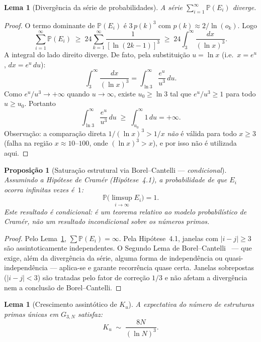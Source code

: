 \documentclass[12pt,a4paper]{article}
\newtheorem{proposition}[theorem]{Proposi\c{c}\~ao}
\newtheorem{lemma}[theorem]{Lema}
\theoremstyle{remark}
\newcommand{\bP}{\mathbb{P}}
\begin{document}
	\begin{lemma}[Divergência da série de probabilidades]
		\label{lem:diverge}
		A s\'erie $\sum_{i=1}^{\infty}\bP(E_i)$ diverge.
	\end{lemma}
	\begin{proof}
		O termo dominante de $\bP(E_i)$ \'e $3\,p(k)^3$ com $p(k)\approx 2/\ln(o_k)$.
		Logo
		\[
		\sum_{i=1}^{\infty}\bP(E_i)
		\;\geq\; 24\sum_{k=1}^{\infty}\frac{1}{[\ln(2k-1)]^3}
		\;\geq\; 24\int_{3}^{\infty}\frac{dx}{(\ln x)^3}.
		\]
		A integral do lado direito diverge. De fato, pela substitui\c{c}\~ao
		$u = \ln x$ (i.e.\ $x = e^u$, $dx = e^u\,du$):
		\[
		\int_{3}^{\infty}\frac{dx}{(\ln x)^3}
		= \int_{\ln 3}^{\infty}\frac{e^u}{u^3}\,du.
		\]
		Como $e^u/u^3 \to +\infty$ quando $u\to\infty$, existe $u_0\geq\ln 3$ tal que
		$e^u/u^3 \geq 1$ para todo $u\geq u_0$. Portanto
		\[
		\int_{\ln 3}^{\infty}\frac{e^u}{u^3}\,du
		\;\geq\; \int_{u_0}^{\infty} 1\,du = +\infty.
		\]
		Observa\c{c}\~ao: a compara\c{c}\~ao direta $1/(\ln x)^3 > 1/x$ \emph{n\~ao} \'e
		v\'alida para todo $x\geq 3$ (falha na regi\~ao $x\approx 10$--$100$,
		onde $(\ln x)^3 > x$), e por isso n\~ao \'e utilizada aqui.
		\qedhere
	\end{proof}
	
	\begin{proposition}[Saturação estrutural via Borel--Cantelli --- \emph{condicional}]
		\label{prop:saturacao}
		\emph{Assumindo} a Hip\'otese de Cram\'er (Hip\'otese~4.1), a probabilidade de que
		$E_i$ ocorra infinitas vezes \'e~$1$:
		\[
		\bP\!\bigl(\limsup_{i\to\infty} E_i\bigr) = 1.
		\]
		Este resultado \'e condicional: \'e um teorema relativo ao modelo probabil\'istico
		de Cram\'er, n\~ao um resultado incondicional sobre os n\'umeros primos.
	\end{proposition}
	\begin{proof}
		Pelo Lema~\ref{lem:diverge}, $\sum\bP(E_i) = \infty$.
		Pela Hip\'otese~4.1, janelas com $|i-j|\geq 3$ s\~ao assintoticamente independentes.
		O Segundo Lema de Borel--Cantelli~\cite{durrett2019} --- que exige, al\'em da
		diverg\^encia da s\'erie, alguma forma de independ\^encia ou quasi-independ\^encia
		--- aplica-se e garante recorr\^encia quase certa.
		Janelas sobrepostas ($|i-j|<3$) s\~ao tratadas pelo fator de corre\c{c}\~ao $1/3$
		e n\~ao afetam a diverg\^encia nem a conclus\~ao de Borel--Cantelli.
	\end{proof}
	
	\begin{lemma}[Crescimento assintótico de $K_u$]
		\label{lem:ku}
		A expectativa do n\'umero de estruturas primas \'unicas em $G_{3,N}$ satisfaz:
		\[
		K_u \;\sim\; \frac{8N}{(\ln N)^3}.
		\]
	\end{lemma}
	
\end{document}
